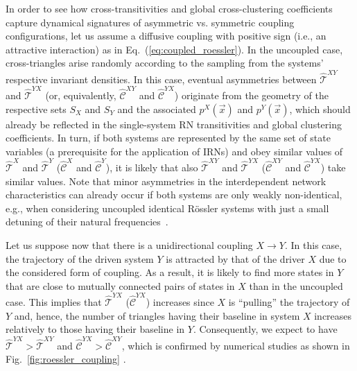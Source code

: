 		In order to see how cross-transitivities and global cross-clustering coefficients capture dynamical signatures of asymmetric vs. symmetric coupling configurations, let us assume a diffusive coupling with positive sign (i.e., an attractive interaction) as in Eq.~(\ref{eq:coupled_roessler}). In the uncoupled case, cross-triangles arise randomly according to the sampling from the systems' respective invariant densities. In this case, eventual asymmetries between $\hat{\mathcal{T}}^{XY}$ and $\hat{\mathcal{T}}^{YX}$ (or, equivalently, $\hat{\mathcal{C}}^{XY}$ and $\hat{\mathcal{C}}^{YX}$) originate from the geometry of the respective sets $S_X$ and $S_Y$ and the associated $p^X(\vec{x})$ and $p^Y(\vec{x})$, which should already be reflected in the single-system RN transitivities and global clustering coefficients. In turn, if both systems are represented by the same set of state variables (a prerequisite for the application of IRNs) and obey similar values of $\hat{\mathcal{T}}^{X}$ and $\hat{\mathcal{T}}^{Y}$ ($\hat{\mathcal{C}}^{X}$ and $\hat{\mathcal{C}}^{Y}$), it is likely that also $\hat{\mathcal{T}}^{XY}$ and $\hat{\mathcal{T}}^{YX}$ ($\hat{\mathcal{C}}^{XY}$ and $\hat{\mathcal{C}}^{YX}$) take similar values. Note that minor asymmetries in the interdependent network characteristics can already occur if both systems are only weakly non-identical, e.g., when considering uncoupled identical R\"ossler systems with just a small detuning of their natural frequencies~\cite{Feldhoff2012}.

		Let us suppose now that there is a unidirectional coupling $X\to Y$. In this case, the trajectory of the driven system $Y$ is attracted by that of the driver $X$ due to the considered form of coupling. As a result, it is likely to find more states in $Y$ that are close to mutually connected pairs of states in $X$ than in the uncoupled case. This implies that $\hat{\mathcal{T}}^{YX}$ ($\hat{\mathcal{C}}^{YX}$) increases since $X$ is ``pulling'' the trajectory of $Y$ and, hence, the number of triangles having their baseline in system $X$ increases relatively to those having their baseline in $Y$. Consequently, we expect to have $\hat{\mathcal{T}}^{YX}>\hat{\mathcal{T}}^{XY}$ and $\hat{\mathcal{C}}^{YX}>\hat{\mathcal{C}}^{XY}$, which is confirmed by numerical studies as shown in Fig.~\ref{fig:roessler_coupling} \cite{Feldhoff2012}.

